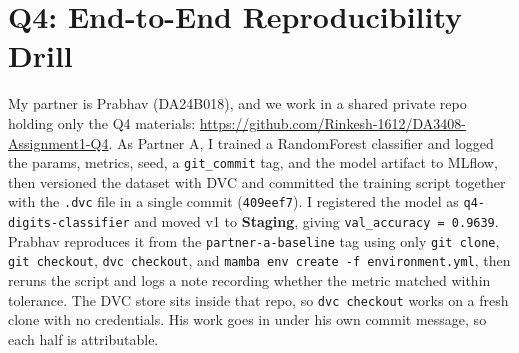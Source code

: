 \documentclass[10pt,a4paper]{article}
\begin{document}
\section*{Q4: End-to-End Reproducibility Drill}
My partner is Prabhav (DA24B018), and we work in a shared private repo holding only the Q4 materials: \url{https://github.com/Rinkesh-1612/DA3408-Assignment1-Q4}. As Partner A, I trained a RandomForest classifier and logged the params, metrics, seed, a \texttt{git\_commit} tag, and the model artifact to MLflow, then versioned the dataset with DVC and committed the training script together with the \texttt{.dvc} file in a single commit (\texttt{409eef7}). I registered the model as \texttt{q4-digits-classifier} and moved v1 to \textbf{Staging}, giving \texttt{val\_accuracy = 0.9639}. Prabhav reproduces it from the \texttt{partner-a-baseline} tag using only \texttt{git clone}, \texttt{git checkout}, \texttt{dvc checkout}, and \texttt{mamba env create -f environment.yml}, then reruns the script and logs a note recording whether the metric matched within tolerance. The DVC store sits inside that repo, so \texttt{dvc checkout} works on a fresh clone with no credentials. His work goes in under his own commit message, so each half is attributable.
\end{document}
